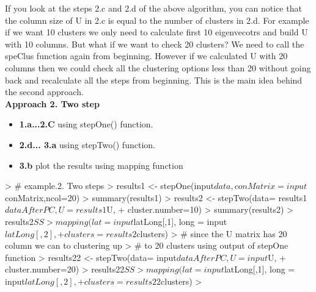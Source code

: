 \documentclass{article}
\begin{document}
If you look at the steps 2.c and 2.d of the above algorithm, you can notice that the column size of U in 2.c is equal to the number of clusters in 2.d. For example if we want 10 clusters we only need to calculate first 10 eigenvecotrs and build U with 10 columns. But what if we want to check 20 clusters? We need to call the speClus function again from beginning. However if we calculated U with 20 columns then we could check all the clustering options less than 20 without going back and recalculate all the steps from beginning. This is the main idea behind the second approach.\\
{\bf Approach 2. Two step} \\
\begin{itemize}
\item {\bf 1.a...2.C} using stepOne() function.
\item {\bf 2.d... 3.a } using stepTwo() function.
\item {\bf 3.b} plot the results using mapping function\\
\end{itemize}
\begin{Schunk}
\begin{Sinput}
> # example.2. Two steps
> results1 <- stepOne(input$data, conMatrix= input$conMatrix,ncol=20)
> summary(results1)
> results2 <- stepTwo(data= results1$dataAfterPC, U = results1$U,
+                     cluster.number=10)
> summary(results2)
> results2$SS
> mapping( lat = input$latLong[,1], long = input$latLong[,2],
+          clusters= results2$clusters)
> # since the U matrix has 20 column we can to clustering up
> # to 20 clusters using output of stepOne function
> results22 <-  stepTwo(data= input$dataAfterPC, U = input$U,
+                        cluster.number=20)
> results22$SS
> mapping( lat = input$latLong[,1], long = input$latLong[,2],
+          clusters= results22$clusters)
> 
\end{Sinput}
\end{Schunk}
\end{document}
